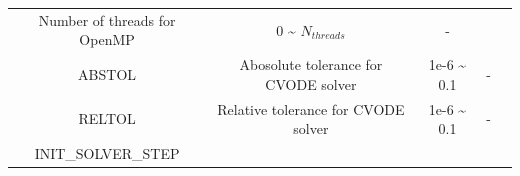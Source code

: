\documentclass[]{scrbook}
\begin{document}
\begin{longtable}[]{@{}ccccc@{}}
\begin{minipage}[t]{0.23\columnwidth}
Number of threads for OpenMP\strut
\end{minipage} & \begin{minipage}[t]{0.10\columnwidth}\centering\strut
0 \textasciitilde{} \(N_{threads}\)\strut
\end{minipage} & \begin{minipage}[t]{0.10\columnwidth}\centering\strut
-\strut
\end{minipage} & \begin{minipage}[t]{0.26\columnwidth}\centering\strut
\strut
\end{minipage}\tabularnewline
\begin{minipage}[t]{0.17\columnwidth}\centering\strut
ABSTOL\strut
\end{minipage} & \begin{minipage}[t]{0.23\columnwidth}\centering\strut
Abosolute tolerance for CVODE solver\strut
\end{minipage} & \begin{minipage}[t]{0.10\columnwidth}\centering\strut
1e-6 \textasciitilde{} 0.1\strut
\end{minipage} & \begin{minipage}[t]{0.10\columnwidth}\centering\strut
-\strut
\end{minipage} & \begin{minipage}[t]{0.26\columnwidth}\centering\strut
\strut
\end{minipage}\tabularnewline
\begin{minipage}[t]{0.17\columnwidth}\centering\strut
RELTOL\strut
\end{minipage} & \begin{minipage}[t]{0.23\columnwidth}\centering\strut
Relative tolerance for CVODE solver\strut
\end{minipage} & \begin{minipage}[t]{0.10\columnwidth}\centering\strut
1e-6 \textasciitilde{} 0.1\strut
\end{minipage} & \begin{minipage}[t]{0.10\columnwidth}\centering\strut
-\strut
\end{minipage} & \begin{minipage}[t]{0.26\columnwidth}\centering\strut
\strut
\end{minipage}\tabularnewline
\begin{minipage}[t]{0.17\columnwidth}\centering\strut
INIT\_SOLVER\_STEP\strut
\end{minipage} & \begin{minipage}[t]{0.23\columnwidth}\centering\strut

\end{minipage}
\end{longtable}
\end{document}
